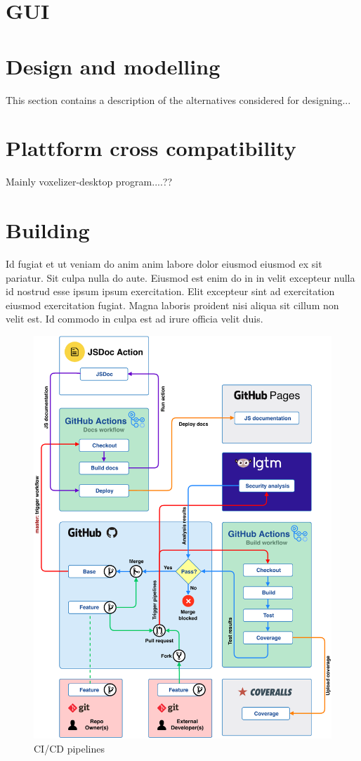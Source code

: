 \section{GUI}


\break
\section{Design and modelling}
This section contains a description of the alternatives considered for designing...


\section{Plattform cross compatibility}
Mainly voxelizer-desktop program....??

\section{Building}
Id fugiat et ut veniam do anim anim labore dolor eiusmod eiusmod ex sit pariatur. Sit culpa nulla do aute. Eiusmod est enim do in in velit excepteur nulla id nostrud esse ipsum ipsum exercitation. Elit excepteur sint ad exercitation eiusmod exercitation fugiat. Magna laboris proident nisi aliqua sit cillum non velit est. Id commodo in culpa est ad irure officia velit duis.

\begin{figure}[h]
    \setlength{\abovecaptionskip}{25pt}
    \centering
    \includegraphics[page=1,scale=1]{sections/methodology/figures/pipelines.pdf}
    \caption{CI/CD pipelines}
    \label{fig:cicd-pipelines}
\end{figure}
\clearpage

